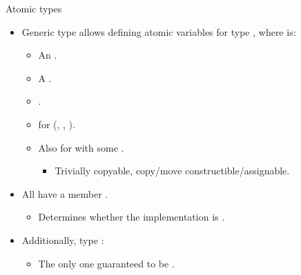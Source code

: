 \begin{frame}[t]{Atomic types}
\begin{itemize}
  \item Generic type  allows defining atomic variables
        for type , where  is:
    \begin{itemize}
      \item An .
      \item A .
      \item {}.
      \item {} for  
            (, , ).
      \item Also for  with some .
        \begin{itemize}
          \item Trivially copyable, copy/move constructible/assignable.
        \end{itemize}
    \end{itemize}

  \item All  have a member .
    \begin{itemize}
      \item Determines whether the implementation is .
    \end{itemize}

  \item Additionally, type :
    \begin{itemize}
      \item The only one guaranteed to be .
    \end{itemize}
\end{itemize}
\end{frame}

